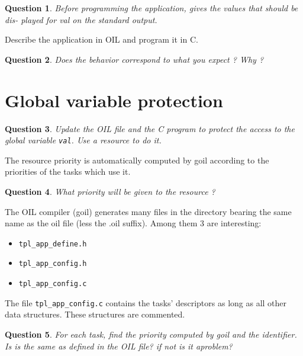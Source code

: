 \documentclass[11pt]{report}
\newtheorem{ex}{Question}
\newcommand{\unixcl}[1]{\texttt{\fcolorbox{black}{gray!20}{\footnotesize#1}}}
\begin{document}
\begin{ex}
Before programming the application, gives the values that should be dis- played for val on the standard output.
\end{ex}

Describe the application in OIL and program it in C.

\begin{ex}
Does the behavior correspond to what you expect ? Why ?
\end{ex}

%

\section{Global variable protection}


\begin{ex}
Update the OIL file and the C program to protect the access to the global variable \texttt{val}. Use a resource to do it.
\end{ex}

The resource priority is automatically computed by goil according to the priorities of the tasks which use it.

\begin{ex}
What priority will be given to the resource ?
\end{ex}

The OIL compiler (goil) generates many files in the directory bearing the same name
as the oil file (less the .oil suffix). Among them 3 are interesting:
\begin{itemize}
\item \texttt{tpl_app_define.h}
\item \texttt{tpl_app_config.h}
\item \texttt{tpl_app_config.c}
\end{itemize}

The file \texttt{tpl_app_config.c} contains the tasks' descriptors as long as all other data structures. These structures are commented.

\begin{ex}
For each task, find the priority computed by goil and the identifier. Is is the same as defined in the OIL file? if not is it aproblem?
\end{ex}
\end{document}
